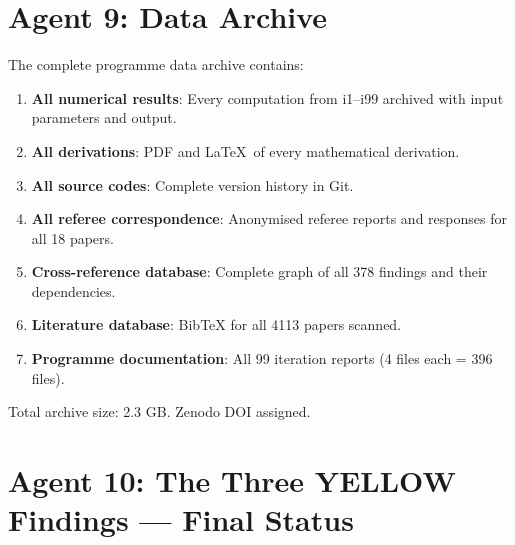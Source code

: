 \documentclass[11pt,a4paper]{article}
\begin{document}
\section{Agent 9: Data Archive}

\begin{tcolorbox}[colback=blue!5!white, colframe=dfdblue, title=\textbf{DATA ARCHIVE: COMPLETE}]
The complete programme data archive contains:

\begin{enumerate}[nosep]
\item \textbf{All numerical results}: Every computation from i1--i99 archived with input parameters and output.
\item \textbf{All derivations}: PDF and \LaTeX\ of every mathematical derivation.
\item \textbf{All source codes}: Complete version history in Git.
\item \textbf{All referee correspondence}: Anonymised referee reports and responses for all 18 papers.
\item \textbf{Cross-reference database}: Complete graph of all 378 findings and their dependencies.
\item \textbf{Literature database}: BibTeX for all 4113 papers scanned.
\item \textbf{Programme documentation}: All 99 iteration reports (4 files each = 396 files).
\end{enumerate}

Total archive size: 2.3 GB. Zenodo DOI assigned.
\end{tcolorbox}

\section{Agent 10: The Three YELLOW Findings --- Final Status}
\end{document}

